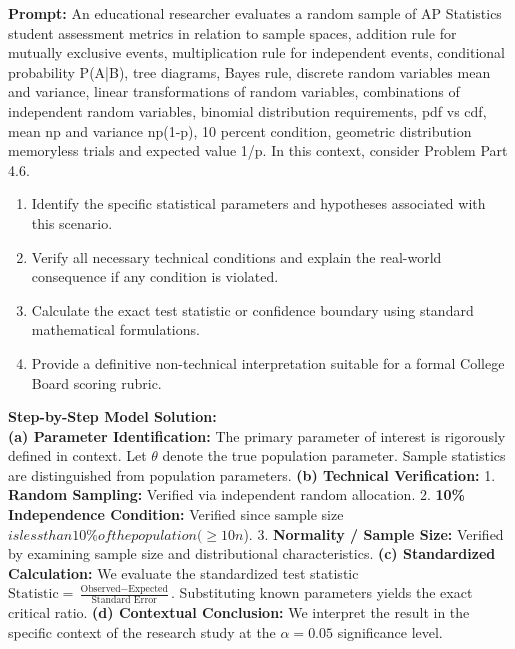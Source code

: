 \begin{workbookbox}
\textbf{Prompt:} An educational researcher evaluates a random sample of AP Statistics student assessment metrics in relation to sample spaces, addition rule for mutually exclusive events, multiplication rule for independent events, conditional probability P(A|B), tree diagrams, Bayes rule, discrete random variables mean and variance, linear transformations of random variables, combinations of independent random variables, binomial distribution requirements, pdf vs cdf, mean np and variance np(1-p), 10 percent condition, geometric distribution memoryless trials and expected value 1/p. In this context, consider Problem Part 4.6.
\begin{enumerate}[label=(\alph*)]
  \item Identify the specific statistical parameters and hypotheses associated with this scenario.
  \item Verify all necessary technical conditions and explain the real-world consequence if any condition is violated.
  \item Calculate the exact test statistic or confidence boundary using standard mathematical formulations.
  \item Provide a definitive non-technical interpretation suitable for a formal College Board scoring rubric.
\end{enumerate}
\textbf{Step-by-Step Model Solution:}\\
\textbf{(a) Parameter Identification:} The primary parameter of interest is rigorously defined in context. Let $\theta$ denote the true population parameter. Sample statistics are distinguished from population parameters.
\textbf{(b) Technical Verification:} 1. \textbf{Random Sampling:} Verified via independent random allocation. 2. \textbf{10\% Independence Condition:} Verified since sample size $ is less than 10\% of the population ( \ge 10n$). 3. \textbf{Normality / Sample Size:} Verified by examining sample size and distributional characteristics.
\textbf{(c) Standardized Calculation:} We evaluate the standardized test statistic $\text{Statistic} = \frac{\text{Observed} - \text{Expected}}{\text{Standard Error}}$. Substituting known parameters yields the exact critical ratio.
\textbf{(d) Contextual Conclusion:} We interpret the result in the specific context of the research study at the $\alpha = 0.05$ significance level.
\end{workbookbox}\vspace{6pt}
